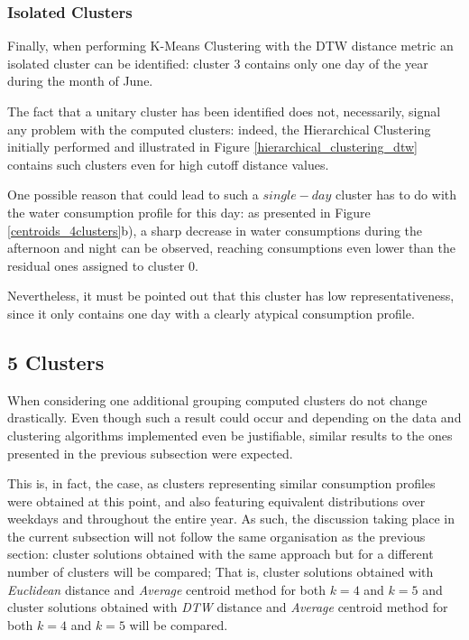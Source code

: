 \documentclass[9pt,journal,compsoc]{IEEEtran}
\begin{document}
\subsubsection{Isolated Clusters}
\label{isolated_clusters}

Finally, when performing K-Means Clustering with the DTW distance metric an isolated cluster can be identified: cluster $3$ contains only one day of the year during the month of June.

The fact that a unitary cluster has been identified does not, necessarily, signal any problem with the computed clusters: indeed, the Hierarchical Clustering initially performed and illustrated in Figure \ref{hierarchical_clustering_dtw} contains such clusters even for high cutoff distance values.

One possible reason that could lead to such a $single-day$ cluster has to do with the water consumption profile for this day: as presented in Figure \ref{centroids_4clusters}b), a sharp decrease in water consumptions during the afternoon and night can be observed, reaching consumptions even lower than the residual ones assigned to cluster $0$.

Nevertheless, it must be pointed out that this cluster has low representativeness, since it only contains one day with a clearly atypical consumption profile. 

\subsection{5 Clusters}
\label{5_clusters}

When considering one additional grouping computed clusters do not change drastically. Even though such a result could occur and depending on the data and clustering algorithms implemented even be justifiable, similar results to the ones presented in the previous subsection were expected.

This is, in fact, the case, as clusters representing similar consumption profiles were obtained at this point, and also featuring equivalent distributions over weekdays and throughout the entire year. As such, the discussion taking place in the current subsection will not follow the same organisation as the previous section: cluster solutions obtained with the same approach but for a different number of clusters will be compared; That is, cluster solutions obtained with \emph{Euclidean} distance and \emph{Average} centroid method for both $k=4$ and $k=5$ and cluster solutions obtained with \emph{DTW} distance and \emph{Average} centroid method for both $k=4$ and $k=5$ will be compared.
\end{document}
